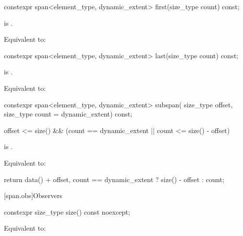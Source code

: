 %
\begin{itemdecl}
constexpr span<element_type, dynamic_extent> first(size_type count) const;
\end{itemdecl}

\begin{itemdescr}
\pnum
\expects
{} is .

\pnum
\effects
Equivalent to: 
\end{itemdescr}

%
\begin{itemdecl}
constexpr span<element_type, dynamic_extent> last(size_type count) const;
\end{itemdecl}

\begin{itemdescr}
\pnum
\expects
{} is .

\pnum
\effects
Equivalent to: 
\end{itemdescr}

%
\begin{itemdecl}
constexpr span<element_type, dynamic_extent> subspan(
  size_type offset, size_type count = dynamic_extent) const;
\end{itemdecl}

\begin{itemdescr}
\pnum
\expects
\begin{codeblock}
offset <= size() && (count == dynamic_extent || count <= size() - offset)
\end{codeblock}
is .

\pnum
\effects
Equivalent to:
\begin{codeblock}
return {data() + offset, count == dynamic_extent ? size() - offset : count};
\end{codeblock}
\end{itemdescr}

[span.obs]{Observers}

%
\begin{itemdecl}
constexpr size_type size() const noexcept;
\end{itemdecl}

\begin{itemdescr}
\pnum
\effects
Equivalent to: 
\end{itemdescr}

